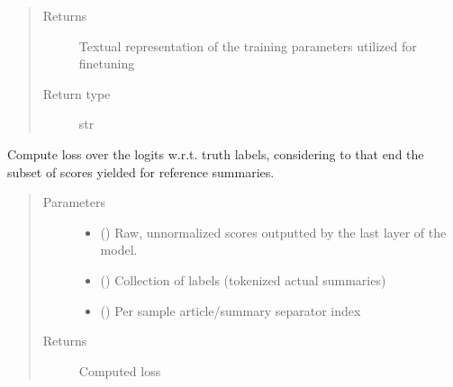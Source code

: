 \documentclass[letterpaper,10pt,english]{sphinxmanual}
\begin{document}
\begin{fulllineitems}
\begin{fulllineitems}
\begin{quote}
\begin{description}
\item[{Returns}] \leavevmode
\sphinxAtStartPar
Textual representation of the training parameters utilized for fine\sphinxhyphen{}tuning

\item[{Return type}] \leavevmode
\sphinxAtStartPar
str

\end{description}\end{quote}

\end{fulllineitems}


\begin{fulllineitems}
\label{\detokenize{code:gpt2_summarizer_train.TrainGPT2Summarizer.compute_loss}}
\sphinxAtStartPar
Compute loss over the logits w.r.t. truth labels, considering to that end the subset of
scores yielded for reference summaries.
\begin{quote}\begin{description}
\item[{Parameters}] \leavevmode\begin{itemize}
\item {} 
\sphinxAtStartPar
{} () \textendash{} Raw, unnormalized scores outputted by the last layer of the model.

\item {} 
\sphinxAtStartPar
{} () \textendash{} Collection of labels (tokenized actual summaries)

\item {} 
\sphinxAtStartPar
{} () \textendash{} Per sample article/summary separator index

\end{itemize}

\item[{Returns}] \leavevmode
\sphinxAtStartPar
Computed loss


\end{description}
\end{quote}
\end{fulllineitems}
\end{fulllineitems}
\end{document}

